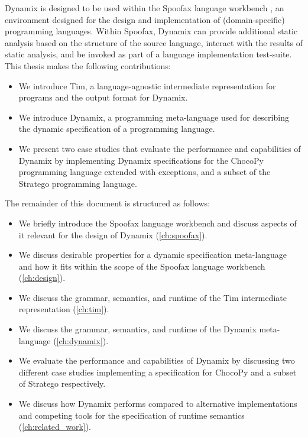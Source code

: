 Dynamix is designed to be used within the Spoofax language workbench \cite{Spoofax2021}, an environment designed for the design and implementation of (domain-specific) programming languages. Within Spoofax, Dynamix can provide additional static analysis based on the structure of the source language, interact with the results of static analysis, and be invoked as part of a language implementation test-suite.\\

\noindent This thesis makes the following contributions:

\begin{itemize}
  \item We introduce Tim, a language-agnostic intermediate representation for programs and the output format for Dynamix.
  \item We introduce Dynamix, a programming meta-language used for describing the dynamic specification of a programming language.
  \item We present two  case studies that evaluate the performance and capabilities of Dynamix by implementing Dynamix specifications for the ChocoPy programming language \cite{PhadyeSH19-SPLASHE} extended with exceptions, and a subset of the Stratego \cite{Visser05-SCAM} programming language.
\end{itemize}

\noindent The remainder of this document is structured as follows:

\begin{itemize}
  \item We briefly introduce the Spoofax language workbench and discuss aspects of it relevant for the design of Dynamix (\cref{ch:spoofax}).
  \item We discuss desirable properties for a dynamic specification meta-language and how it fits within the scope of the Spoofax language workbench (\cref{ch:design}).
  \item We discuss the grammar, semantics, and runtime of the Tim intermediate representation (\cref{ch:tim}).
  \item We discuss the grammar, semantics, and runtime of the Dynamix meta-language (\cref{ch:dynamix}).
  \item We evaluate the performance and capabilities of Dynamix by discussing two different case studies implementing a specification for ChocoPy \cite{PhadyeSH19-SPLASHE} and a subset of Stratego \cite{Visser05-SCAM} respectively.
  \item We discuss how Dynamix performs compared to alternative implementations and competing tools for the specification of runtime semantics (\cref{ch:related_work}).
\end{itemize}